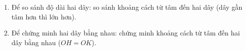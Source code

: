 \begin{enumerate}
\item Để so sánh độ dài hai dây: so sánh khoảng cách từ tâm đến hai dây (dây gần tâm hơn thì lớn hơn).
\item Để chứng minh hai dây bằng nhau: chứng minh khoảng cách từ tâm đến hai dây bằng nhau ($OH = OK$).
\end{enumerate}

